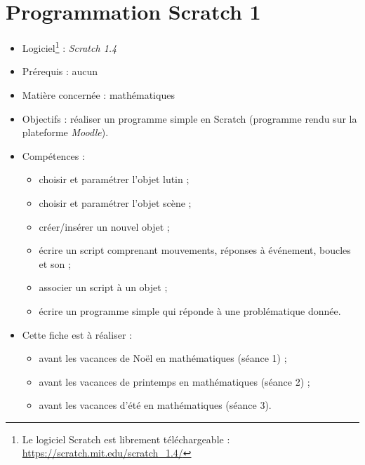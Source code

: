 \chapter{Programmation Scratch 1}\label{ficheScratch1}  

\begin{itemize}
\item Logiciel\footnote{Le logiciel Scratch est librement téléchargeable : \url{https://scratch.mit.edu/scratch_1.4/}} : \emph{Scratch 1.4}
\item Prérequis : aucun
\item Matière concernée : mathématiques
\item Objectifs : réaliser un programme simple en Scratch (programme rendu sur la plateforme \emph{Moodle}).
\item Compétences : 
        \begin{itemize}
        \item choisir et paramétrer l'objet lutin ;
        \item choisir et paramétrer l'objet scène ;
        \item créer/insérer un nouvel objet ; 
        \item écrire un script comprenant mouvements, réponses à événement, boucles et son ;
        \item associer un script à un objet ;
        \item écrire un programme simple qui réponde à une problématique donnée.
        \end{itemize}
\item Cette fiche est à réaliser :
        \begin{itemize}
        \item avant les vacances de Noël en mathématiques (séance 1) ;
        \item avant les vacances de printemps en mathématiques (séance 2)  ;
        \item avant les vacances d'été en mathématiques (séance 3). 
        \end{itemize}
\end{itemize}

















